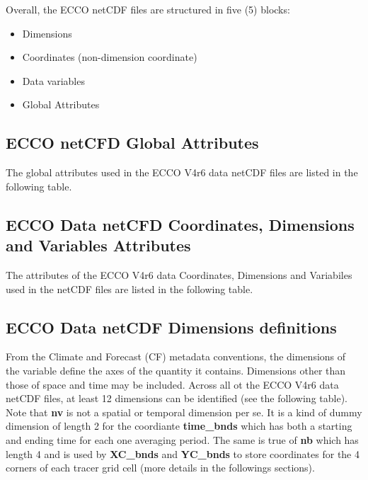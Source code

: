 \par \vspace{0.1in} Overall, the ECCO netCDF  files are structured in five (5) blocks: 
\begin{itemize}
    \item Dimensions
    \item Coordinates (non-dimension coordinate)
    \item Data variables
    \item Global Attributes
\end{itemize}

\newpage

\subsection{ECCO netCFD Global Attributes}
\par The global attributes used in the ECCO V4r6 data netCDF files are listed in the following table.
 

\newpage

\subsection{ECCO Data netCFD Coordinates, Dimensions and Variables Attributes}
\par The attributes of the ECCO V4r6 data Coordinates, Dimensions and Variabiles used in the netCDF files are listed in the following table.
 

\newpage

\subsection{ECCO Data netCDF Dimensions definitions}
From the Climate and Forecast (CF) metadata conventions, the dimensions of the variable define the axes of the quantity it contains. Dimensions other than those of space and time may be included. Across all ot the ECCO V4r6 data netCDF files, at least 12 dimensions can be identified (see the following table). Note that \textbf{nv} is not a spatial or temporal dimension per se. It is a kind of dummy dimension of length 2 for the coordiante \textbf{time\_bnds} which has both a starting and ending time for each one averaging period. The same is true of \textbf{nb} which has length 4 and is used by \textbf{XC\_bnds} and \textbf{YC\_bnds} to store coordinates for the 4 corners of each tracer grid cell (more details in the followings sections).


